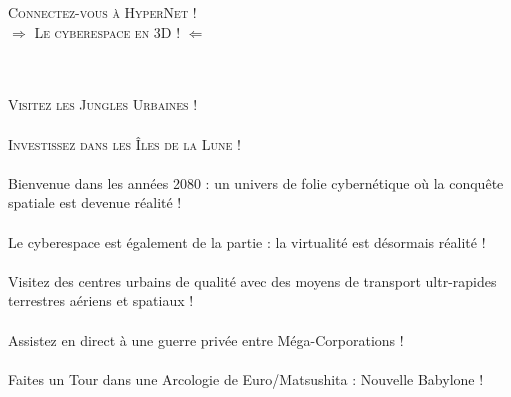 \documentclass[40pt,twoside,a4paper]{article}
\begin{document}
\begin{minipage}[ht]{0.65\textwidth}
	\begin{center}
		\textsc{\LARGE Connectez-vous {\`a} HyperNet !~\\ 
			$\Longrightarrow$ Le cyberespace en 3D ! $\Longleftarrow$}
	\end{center}
	~\\~\\
	
	\textsc{\LARGE Visitez les Jungles Urbaines !}~\\~\\
	\textsc{\LARGE Investissez dans les {\^I}les de la Lune !}~\\~\\
	
	{\Large
		Bienvenue dans les ann{\'e}es 2080 : un univers de folie cybern{\'e}tique o{\`u} la conqu{\^e}te spatiale est devenue r{\'e}alit{\'e} !~\\~\\
		Le cyberespace est {\'e}galement de la partie : la virtualit{\'e} est d{\'e}sormais r{\'e}alit{\'e} !~\\~\\
		Visitez des centres urbains de qualit{\'e} avec des moyens de transport ultr-rapides terrestres a{\'e}riens et spatiaux !~\\~\\
		Assistez en direct {\`a} une guerre priv{\'e}e entre M{\'e}ga-Corporations !~\\~\\
		Faites un Tour dans une Arcologie de Euro/Matsushita : Nouvelle Babylone !~\\~\\
	}


\end{minipage}
\end{document}
